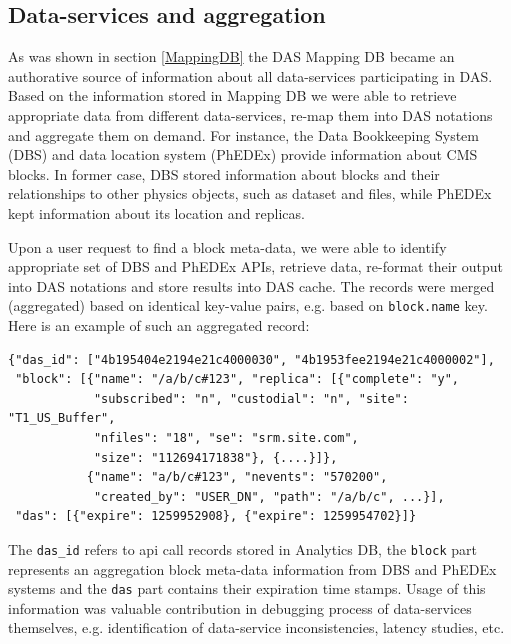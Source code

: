 \documentclass[1p,times]{elsarticle}
\begin{document}
\subsection{Data-services and aggregation}
As was shown in section \ref{MappingDB} the DAS Mapping DB became an authorative
source of information about all data-services participating in DAS.
Based on the information stored in Mapping DB we were able to 
retrieve appropriate data from different data-services, re-map them into 
DAS notations and aggregate them on demand. For instance, the Data 
Bookkeeping System (DBS) \cite{DBS} and data location system (PhEDEx) \cite{PhEDEx}
provide information about CMS blocks. In former case, DBS 
stored information about blocks and their relationships to other 
physics objects, such as dataset and files, while PhEDEx kept
information about its location and replicas. 

Upon a user request to 
find a block meta-data, we were able to identify appropriate set of 
DBS and PhEDEx APIs, retrieve data, re-format their output 
into DAS notations and store results into DAS cache. The records
were merged (aggregated) based on identical key-value pairs, e.g.
based on \verb+block.name+ key. Here is an example of such an aggregated record:
\begin{verbatim}
{"das_id": ["4b195404e2194e21c4000030", "4b1953fee2194e21c4000002"], 
 "block": [{"name": "/a/b/c#123", "replica": [{"complete": "y", 
            "subscribed": "n", "custodial": "n", "site": "T1_US_Buffer", 
            "nfiles": "18", "se": "srm.site.com", 
            "size": "112694171838"}, {....}]},
           {"name": "a/b/c#123", "nevents": "570200", 
            "created_by": "USER_DN", "path": "/a/b/c", ...}],
 "das": [{"expire": 1259952908}, {"expire": 1259954702}]}
\end{verbatim}
The \verb+das_id+ refers to api call records stored in Analytics DB,
the \verb+block+ part represents an aggregation block meta-data information from DBS
and PhEDEx systems and the \verb+das+ part contains their expiration time stamps.
Usage of this information was valuable contribution in debugging process of
data-services themselves, e.g. identification of data-service inconsistencies, 
latency studies, etc.
\end{document}
